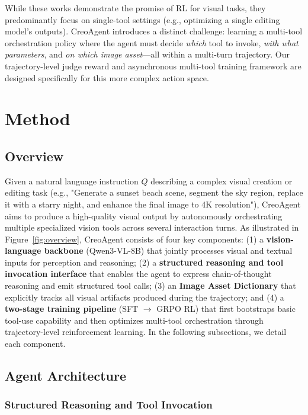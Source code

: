 \documentclass[11pt]{article}
\begin{document}
While these works demonstrate the promise of RL for visual tasks, they predominantly focus on single-tool settings (e.g., optimizing a single editing model's outputs). CreoAgent introduces a distinct challenge: learning a multi-tool orchestration policy where the agent must decide \textit{which} tool to invoke, \textit{with what parameters}, and \textit{on which image asset}—all within a multi-turn trajectory. Our trajectory-level judge reward and asynchronous multi-tool training framework are designed specifically for this more complex action space.


\section{Method}

\subsection{Overview}

Given a natural language instruction $Q$ describing a complex visual creation or editing task (e.g., "Generate a sunset beach scene, segment the sky region, replace it with a starry night, and enhance the final image to 4K resolution"), CreoAgent aims to produce a high-quality visual output by autonomously orchestrating multiple specialized vision tools across several interaction turns. As illustrated in Figure~\ref{fig:overview}, CreoAgent consists of four key components: (1) a \textbf{vision-language backbone} (Qwen3-VL-8B) that jointly processes visual and textual inputs for perception and reasoning; (2) a \textbf{structured reasoning and tool invocation interface} that enables the agent to express chain-of-thought reasoning and emit structured tool calls; (3) an \textbf{Image Asset Dictionary} that explicitly tracks all visual artifacts produced during the trajectory; and (4) a \textbf{two-stage training pipeline} (SFT $\rightarrow$ GRPO RL) that first bootstraps basic tool-use capability and then optimizes multi-tool orchestration through trajectory-level reinforcement learning. In the following subsections, we detail each component.

\subsection{Agent Architecture}

\subsubsection{Structured Reasoning and Tool Invocation}
\end{document}
